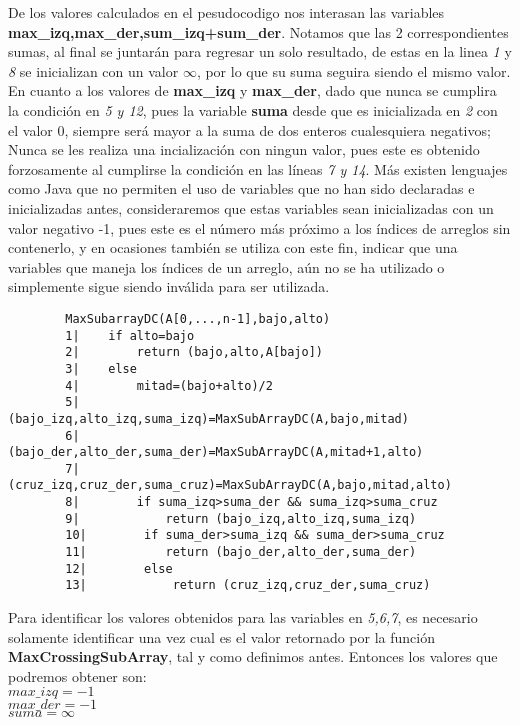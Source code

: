     De los valores calculados en el pesudocodigo nos interasan las variables \textbf{max\_izq,max\_der,sum\_izq+sum\_der}. Notamos que las 2 correspondientes sumas, al final se juntarán para regresar un solo resultado, de estas en la linea \textit{1} y \textit{8} se inicializan con un valor $\infty$, por lo que su suma seguira siendo el mismo valor.\\
    
    En cuanto a los valores de \textbf{max\_izq} y \textbf{max\_der}, dado que nunca se cumplira la condición en \textit{5 y 12}, pues la variable \textbf{suma} desde que es inicializada en \textit{2} con el valor 0, siempre será mayor a la suma de dos enteros cualesquiera negativos; Nunca se les realiza una incialización con ningun valor, pues este es obtenido forzosamente al cumplirse la condición en las líneas \textit{7 y 14}. Más existen lenguajes como Java que no permiten el uso de variables que no han sido declaradas e inicializadas antes, consideraremos que estas variables sean inicializadas con un valor negativo -1, pues este es el número más próximo a los índices de arreglos sin contenerlo, y en ocasiones también se utiliza con este fin, indicar que una variables que maneja los índices de un arreglo, aún no se ha utilizado o simplemente sigue siendo inválida para ser utilizada.
    
    \begin{verbatim}
        MaxSubarrayDC(A[0,...,n-1],bajo,alto)
        1|    if alto=bajo
        2|        return (bajo,alto,A[bajo])
        3|    else
        4|        mitad=(bajo+alto)/2
        5|        (bajo_izq,alto_izq,suma_izq)=MaxSubArrayDC(A,bajo,mitad)
        6|        (bajo_der,alto_der,suma_der)=MaxSubArrayDC(A,mitad+1,alto)
        7|        (cruz_izq,cruz_der,suma_cruz)=MaxSubArrayDC(A,bajo,mitad,alto)
        8|        if suma_izq>suma_der && suma_izq>suma_cruz
        9|            return (bajo_izq,alto_izq,suma_izq)
        10|        if suma_der>suma_izq && suma_der>suma_cruz
        11|           return (bajo_der,alto_der,suma_der)
        12|        else
        13|            return (cruz_izq,cruz_der,suma_cruz)
    \end{verbatim}
    
    Para identificar los valores obtenidos para las variables en \textit{5,6,7}, es necesario solamente identificar una vez cual es el valor retornado por la función \textbf{MaxCrossingSubArray}, tal y como definimos antes. Entonces los valores que podremos obtener son:\\
    $max\_izq = -1$\\
    $max\_der = -1$\\
    $suma = \infty$\\
    
